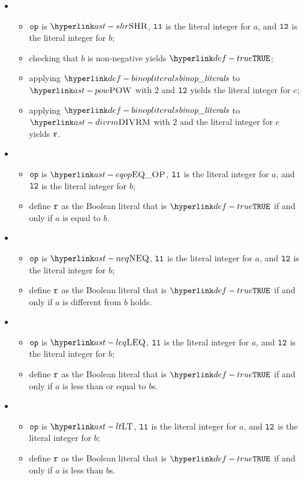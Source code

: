 \begin{itemize}
  \item {}
  \begin{itemize}
    \item $\texttt{op}$ is $\SHR$, $\texttt{l1}$ is the literal integer for $a$, and $\texttt{l2}$ is the literal integer for $b$;
    \item checking that $b$ is non-negative yields $\True$\ProseOrTypeError;
    \item applying $\binopliterals$ to $\POW$ with $2$ and $\texttt{l2}$ yields the literal integer for $e$;
    \item applying $\binopliterals$ to $\DIVRM$ with $2$ and the literal integer for $e$ yields $\texttt{r}$.
  \end{itemize}

  \item {}
  \begin{itemize}
    \item $\texttt{op}$ is $\EQOP$, $\texttt{l1}$ is the literal integer for $a$, and $\texttt{l2}$ is the literal integer for $b$;
    \item define $\texttt{r}$ as the Boolean literal that is $\True$ if and only if $a$ is equal to $b$.
  \end{itemize}

  \item {}
  \begin{itemize}
    \item $\texttt{op}$ is $\NEQ$, $\texttt{l1}$ is the literal integer for $a$, and $\texttt{l2}$ is the literal integer for $b$;
    \item define $\texttt{r}$ as the Boolean literal that is $\True$ if and only if $a$ is different from $b$ holds.
  \end{itemize}

  \item {}
  \begin{itemize}
    \item $\texttt{op}$ is $\LEQ$, $\texttt{l1}$ is the literal integer for $a$, and $\texttt{l2}$ is the literal integer for $b$;
    \item define $\texttt{r}$ as the Boolean literal that is $\True$ if and only if $a$ is less than or equal to $b$s.
  \end{itemize}

  \item {}
  \begin{itemize}
    \item $\texttt{op}$ is $\LT$, $\texttt{l1}$ is the literal integer for $a$, and $\texttt{l2}$ is the literal integer for $b$;
    \item define $\texttt{r}$ as the Boolean literal that is $\True$ if and only if $a$ is less than $b$s.
  \end{itemize}


\end{itemize}
